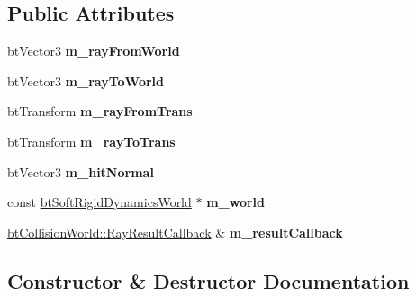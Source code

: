 \subsection*{Public Attributes}
\begin{DoxyCompactItemize}
\item 
\mbox{\label{structbtSoftSingleRayCallback_a68f6d8119b8d1895ae9765c3e585ed2f}} 
bt\+Vector3 {\bfseries m\+\_\+ray\+From\+World}
\item 
\mbox{\label{structbtSoftSingleRayCallback_a0e42ccec50994139110bd733ed11b347}} 
bt\+Vector3 {\bfseries m\+\_\+ray\+To\+World}
\item 
\mbox{\label{structbtSoftSingleRayCallback_a132922b82b3241e0519c8adc01cc4ce3}} 
bt\+Transform {\bfseries m\+\_\+ray\+From\+Trans}
\item 
\mbox{\label{structbtSoftSingleRayCallback_a851cf14d6a16dd7e0616498c20cbb2ab}} 
bt\+Transform {\bfseries m\+\_\+ray\+To\+Trans}
\item 
\mbox{\label{structbtSoftSingleRayCallback_a3c7f2ca88411446fe10a57fe767232b0}} 
bt\+Vector3 {\bfseries m\+\_\+hit\+Normal}
\item 
\mbox{\label{structbtSoftSingleRayCallback_a7d1f57ecc6246ada02f47c144069878a}} 
const \hyperlink{classbtSoftRigidDynamicsWorld}{bt\+Soft\+Rigid\+Dynamics\+World} $\ast$ {\bfseries m\+\_\+world}
\item 
\mbox{\label{structbtSoftSingleRayCallback_ad8b8d0e1e2031ee44c6ab40ef646a680}} 
\hyperlink{structbtCollisionWorld_1_1RayResultCallback}{bt\+Collision\+World\+::\+Ray\+Result\+Callback} \& {\bfseries m\+\_\+result\+Callback}
\end{DoxyCompactItemize}


\subsection{Constructor \& Destructor Documentation}
\mbox{\label{structbtSoftSingleRayCallback_ae3a700f866158df32a38877dc08eac9f}} 
